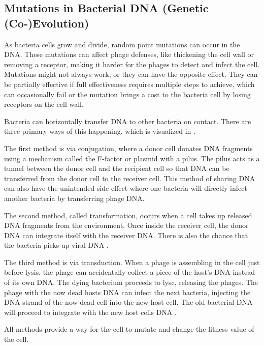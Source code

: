 \subsection{Mutations in Bacterial DNA (Genetic (Co-)Evolution)}
As bacteria cells grow and divide, random point mutations can occur in the DNA. 
These mutations can affect phage defenses, like thickening the cell wall or removing a receptor, making it harder for the phages to detect and  infect the cell. 
Mutations might not always work, or they can have the opposite effect. 
They can be partially effective if full effectiveness requires multiple steps to achieve, which can occasionally fail \cite{lenskiTWOSTEPRESISTANCEESCHERICHIA1984} or the mutation brings a cost to the bacteria cell by losing receptors on the cell wall. \newline

Bacteria can horizontally transfer DNA to other bacteria on contact. 
There are three primary ways of this happening, which is visualized in . 

The first method is via conjugation, where a donor cell donates DNA fragments using a mechanism called the F-factor or plasmid with a pilus. 
The pilus acts as a tunnel between the donor cell and the recipient cell so that DNA can be transferred from the donor cell to the receiver cell. 
This method of sharing DNA can also have the unintended side effect where one bacteria will directly infect another bacteria by transferring phage DNA. 

The second method, called transformation, occurs when a cell takes up released DNA fragments from the environment. 
Once inside the receiver cell, the donor DNA can integrate itself with the receiver DNA. 
There is also the chance that the bacteria picks up viral DNA \cite{chenInsOutsDNA2005}. 

The third method is via transduction. 
When a phage is assembling in the cell just before lysis, the phage can accidentally collect a piece of the host's DNA instead of its own DNA. 
The dying bacterium proceeds to lyse, releasing the phages. 
The phage with the now dead hosts DNA can infect the next bacteria, injecting the DNA strand of the now dead cell into the new host cell. 
The old bacterial DNA will proceed to integrate with the new host cells DNA \cite{tamangHorizontalGeneTransfer2023, kasmanBacteriophages2025}. 

All methods provide a way for the cell to mutate and change the fitness value of the cell.

